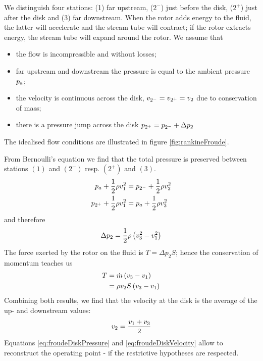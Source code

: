 We distinguish four stations: (1) far upstream, ($2^-$) just before
the disk, ($2^+$) just after the disk and (3) far downstream. When the
rotor adds energy to the fluid, the latter will accelerate and the
stream tube will contract; if the rotor extracts energy, the stream
tube will expand around the rotor. We assume that
\begin{itemize}
\item the flow is incompressible and without losses;
\item far upstream and downstream the pressure is equal to the ambient
  pressure $p_a$; 
\item the velocity is continuous across the disk, \ie $v_{2^-} =
  v_{2^+} =v_{2}$ due to conservation of mass;
\item there is a pressure jump across the disk $p_{2^+} =
  p_{2^-} + \Delta p_2$
\end{itemize}
The idealised flow conditions are illustrated in figure
\ref{fig:rankineFroude}.

From Bernoulli's equation we find that the total pressure is preserved
between stations $(1)$ and $(2^-)$ resp. $(2^+)$ and $(3)$.
\begin{align*}
  p_a + \frac{1}{2} \rho v_1^2 &= p_{2^-} + \frac{1}{2} \rho v_2^2 \\
  p_{2^+} + \frac{1}{2} \rho v_1^2 &= p_a + \frac{1}{2} \rho v_3^2 \\
\end{align*}
and therefore
\begin{equation}
  \begin{split}
    \Delta p_2 = \frac{1}{2} \rho \left(v_3^2 - v_1^2\right) 
  \end{split}
  \label{eq:froudeDiskPressure}
\end{equation}
The force exerted by the rotor on the fluid is $T = \Delta p_2 S$;
hence the conservation of momentum teaches us
\begin{align*}
  T 
  &= \dot m \left(v_3 - v_1\right) \\
  &= \rho v_2 S \left(v_3 - v_1\right)
\end{align*}
Combining both results, we find that the velocity at the disk is the
average of the up- and downstream values: 
\begin{equation}
  v_2 = \frac{v_1 +v_3}{2}
  \label{eq:froudeDiskVelocity}
\end{equation}
Equations \ref{eq:froudeDiskPressure} and \ref{eq:froudeDiskVelocity}
allow to reconstruct the operating point - if the restrictive
hypotheses are respected.

